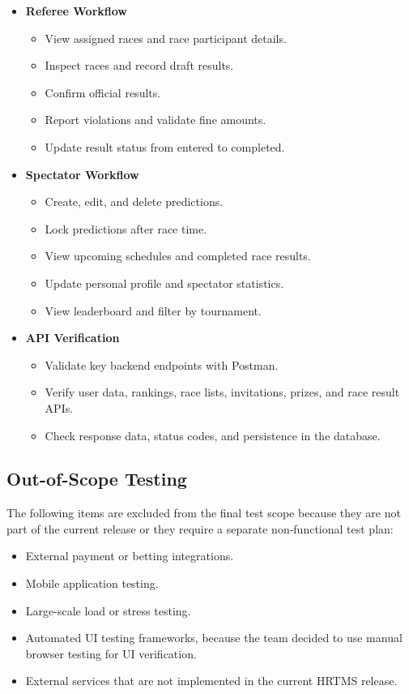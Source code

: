 \begin{itemize}
    \item \textbf{Referee Workflow}
    \begin{itemize}
        \item View assigned races and race participant details.
        \item Inspect races and record draft results.
        \item Confirm official results.
        \item Report violations and validate fine amounts.
        \item Update result status from entered to completed.
    \end{itemize}

    \item \textbf{Spectator Workflow}
    \begin{itemize}
        \item Create, edit, and delete predictions.
        \item Lock predictions after race time.
        \item View upcoming schedules and completed race results.
        \item Update personal profile and spectator statistics.
        \item View leaderboard and filter by tournament.
    \end{itemize}

    \item \textbf{API Verification}
    \begin{itemize}
        \item Validate key backend endpoints with Postman.
        \item Verify user data, rankings, race lists, invitations, prizes, and race result APIs.
        \item Check response data, status codes, and persistence in the database.
    \end{itemize}
\end{itemize}

\subsection{Out-of-Scope Testing}

The following items are excluded from the final test scope because they are not part of the current release or they require a separate non-functional test plan:

\begin{itemize}
    \item External payment or betting integrations.
    \item Mobile application testing.
    \item Large-scale load or stress testing.
    \item Automated UI testing frameworks, because the team decided to use manual browser testing for UI verification.
    \item External services that are not implemented in the current HRTMS release.
\end{itemize}

